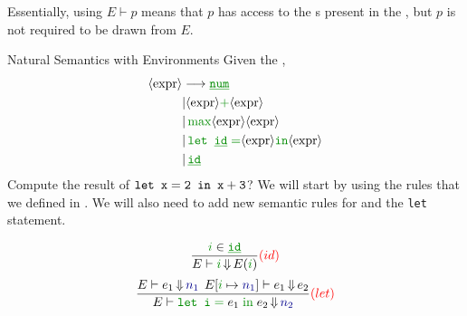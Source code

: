 Essentially, using $E \vdash p$ means that $p$ has access to the s present in the , but $p$ is not required to be drawn from $E$.

\begin{example}[Lecture 3]{Natural Semantics with Environments}
  Given the ,
  \begin{align*}
    \Nonterminal{expr} &\longrightarrow \SemanticInput{\underline{\mathtt{num}}} \\
                       &\vert \Nonterminal{expr} \SemanticInput{+} \Nonterminal{expr} \\
                       &\vert \, \SemanticInput{\mathtt{\max}} \Nonterminal{expr} \Nonterminal{expr} \\
                       &\vert \, \SemanticInput{\text{\texttt{let \underline{id}}} = } \Nonterminal{expr} \SemanticInput{\mathtt{in}} \Nonterminal{expr} \\
                       &\vert \, \SemanticInput{\mathtt{\underline{id}}}
  \end{align*}
  Compute the result of $\text{\texttt{let }} \mathtt{x = 2} \text{\texttt{ in }} \mathtt{x+3}$?
  \tcblower{}
  We will start by using the rules that we defined in .
  We will also need to add new semantic rules for  and the \texttt{let} statement.

  \begin{equation*}
    \frac{\SemanticInput{i} \in \SemanticInput{\mathtt{\underline{id}}}}{E \vdash \SemanticInput{i} \EvaluatesTo E(\SemanticInput{i})} \textcolor{red}{(id)}
  \end{equation*}
  \begin{equation*}
    \frac{E \vdash e_{1} \EvaluatesTo \textcolor{Blue4}{n_{1}} \:\: E[\SemanticInput{i} \mapsto \textcolor{Blue4}{n_{1}}] \vdash e_{1} \EvaluatesTo e_{2}}{E \vdash \SemanticInput{\text{\texttt{let }}\mathtt{i =}} \; e_{1} \; \SemanticInput{\mathtt{\text{in}}} \; e_{2} \EvaluatesTo \textcolor{Blue4}{n_{2}}} \textcolor{red}{(let)}
  \end{equation*}


\end{example}

